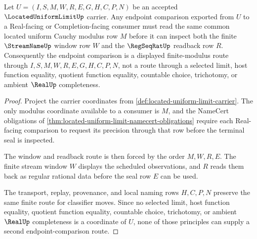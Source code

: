 \begin{theorem}
\label{thm:located-uniform-limit-modulus-handoff}
Let $U=(I,S,M,W,R,E,G,H,C,P,N)$ be an accepted
$\LocatedUniformLimitUp$ carrier. Any endpoint comparison exported from $U$
to a Real-facing or Completion-facing consumer must read the same common
located uniform Cauchy modulus row $M$ before it can inspect both the finite
$\StreamNameUp$ window row $W$ and the $\RegSeqRatUp$ readback row $R$.
Consequently the endpoint comparison is a displayed finite-modulus route
through $I,S,M,W,R,E,G,H,C,P,N$, not a route through a selected limit, host
function equality, quotient function equality, countable choice, trichotomy,
or ambient $\RealUp$ completeness.
\end{theorem}
\begin{proof}
Project the carrier coordinates from
\autoref{def:located-uniform-limit-carrier}. The only modulus coordinate
available to a consumer is $M$, and the NameCert obligations of
\autoref{thm:located-uniform-limit-namecert-obligations} require each
Real-facing comparison to request its precision through that row before the
terminal seal is inspected.

The window and readback route is then forced by the order $M,W,R,E$. The
finite stream window $W$ displays the scheduled observations, and $R$ reads
them back as regular rational data before the seal row $E$ can be used.

The transport, replay, provenance, and local naming rows $H,C,P,N$ preserve
the same finite route for classifier moves. Since no selected limit, host
function equality, quotient function equality, countable choice, trichotomy,
or ambient $\RealUp$ completeness is a coordinate of $U$, none of those
principles can supply a second endpoint-comparison route.
\end{proof}

